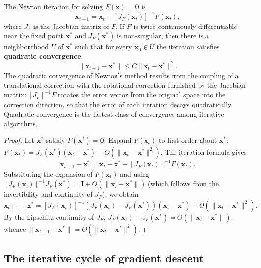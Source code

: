 \begin{proposition}\label{prop:newton_quadratic}
The Newton iteration for solving $F(\mathbf{x}) = \mathbf{0}$ is
\[
\mathbf{x}_{t+1} = \mathbf{x}_t - [J_F(\mathbf{x}_t)]^{-1} F(\mathbf{x}_t),
\]
where $J_F$ is the Jacobian matrix of $F$. If $F$ is twice continuously differentiable near the fixed point $\mathbf{x}^*$ and $J_F(\mathbf{x}^*)$ is non-singular, then there is a neighbourhood $U$ of $\mathbf{x}^*$ such that for every $\mathbf{x}_0 \in U$ the iteration satisfies \textbf{quadratic convergence}:
\[
\|\mathbf{x}_{t+1} - \mathbf{x}^*\| \le C \|\mathbf{x}_t - \mathbf{x}^*\|^2.
\]
The quadratic convergence of Newton's method results from the coupling of a translational correction with the rotational correction furnished by the Jacobian matrix: $[J_F]^{-1}F$ rotates the error vector from the original space into the correction direction, so that the error of each iteration decays quadratically. Quadratic convergence is the fastest class of convergence among iterative algorithms.
\end{proposition}

\begin{proof}
Let $\mathbf{x}^*$ satisfy $F(\mathbf{x}^*) = \mathbf{0}$. Expand $F(\mathbf{x}_t)$ to first order about $\mathbf{x}^*$: $F(\mathbf{x}_t) = J_F(\mathbf{x}^*)(\mathbf{x}_t - \mathbf{x}^*) + O(\|\mathbf{x}_t - \mathbf{x}^*\|^2)$. The iteration formula gives
\[
\mathbf{x}_{t+1} - \mathbf{x}^* = \mathbf{x}_t - \mathbf{x}^* - [J_F(\mathbf{x}_t)]^{-1} F(\mathbf{x}_t).
\]
Substituting the expansion of $F(\mathbf{x}_t)$ and using $[J_F(\mathbf{x}_t)]^{-1} J_F(\mathbf{x}^*) = \mathbf{I} + O(\|\mathbf{x}_t - \mathbf{x}^*\|)$ (which follows from the invertibility and continuity of $J_F$), we obtain
\[
\mathbf{x}_{t+1} - \mathbf{x}^* = [J_F(\mathbf{x}_t)]^{-1} \left( J_F(\mathbf{x}_t) - J_F(\mathbf{x}^*) \right)(\mathbf{x}_t - \mathbf{x}^*) + O(\|\mathbf{x}_t - \mathbf{x}^*\|^2).
\]
By the Lipschitz continuity of $J_F$, $J_F(\mathbf{x}_t) - J_F(\mathbf{x}^*) = O(\|\mathbf{x}_t - \mathbf{x}^*\|)$, whence $\|\mathbf{x}_{t+1} - \mathbf{x}^*\| = O(\|\mathbf{x}_t - \mathbf{x}^*\|^2)$.
\end{proof}

\subsection{The iterative cycle of gradient descent}

